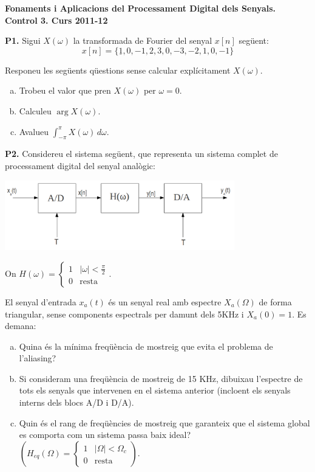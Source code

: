 \documentclass[12pt]{report}
\begin{document}
\begin{center}
\textbf{\Large Fonaments i Aplicacions del Processament Digital dels Senyals.\\ 
Control 3. Curs 2011-12}
\end{center}

\vskip 1cm
\noindent
\textbf{P1.} Sigui $X(\omega)$ la transformada de Fourier del senyal $x[n]$ següent:
\[
x[n]=\{ \underline{1}, 0, -1, 2, 3, 0, -3, -2, 1, 0, -1 \}
\]

  Responeu les següents qüestions sense calcular explícitament
  $X(\omega)$. 
  \begin{enumerate}[a)]
  \item Trobeu el valor que pren $X(\omega)$ per $\omega=0$.
  \item Calculeu $\arg X(\omega)$.
  \item Avalueu $\int_{-\pi}^\pi X(\omega)\,d\omega$.
  \end{enumerate}

\vskip 1cm
\noindent
\textbf{P2.}
Considereu el sistema següent, que representa un sistema complet
  de processament digital del senyal analògic:
\begin{center}
\includegraphics[width=10cm]{adda.png}
\end{center}

On $H(\omega)=\begin{cases} 1 & |\omega| < \frac{\pi}{2} \\ 0 & \text{resta} \end{cases}$.


El senyal d'entrada $x_a(t)$ és un senyal real amb espectre $X_a(\Omega)$ 
de forma triangular, sense components espectrals per damunt dels 5KHz i $X_a(0)=1$.
Es demana:
\begin{enumerate}[a)]
\item Quina és la mínima freqüència de mostreig que evita el problema de l'aliasing?
\item Si consideram una freqüència de mostreig de 15 KHz, dibuixau l'espectre de tots 
els senyals que intervenen en el sistema anterior (incloent els senyals interns dels blocs 
A/D i D/A).
\item Quin és el rang de freqüències de mostreig que garanteix que el sistema global
es comporta com un sistema passa baix ideal?
$\left( H_{eq}(\Omega)=\begin{cases} 1 & |\Omega| < \Omega_c \\ 0 & \text{resta} 
\end{cases}\right)$.
\end{enumerate}
\end{document}
